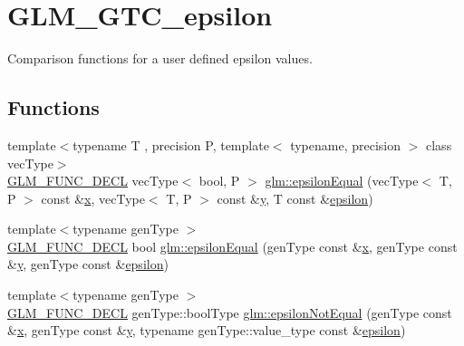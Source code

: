 \hypertarget{group__gtc__epsilon}{}\section{G\+L\+M\+\_\+\+G\+T\+C\+\_\+epsilon}
\label{group__gtc__epsilon}


Comparison functions for a user defined epsilon values.  


\subsection*{Functions}
\begin{DoxyCompactItemize}
\item 
{\footnotesize template$<$typename T , precision P, template$<$ typename, precision $>$ class vec\+Type$>$ }\\\mbox{\hyperlink{setup_8hpp_ab2d052de21a70539923e9bcbf6e83a51}{G\+L\+M\+\_\+\+F\+U\+N\+C\+\_\+\+D\+E\+CL}} vec\+Type$<$ bool, P $>$ \mbox{\hyperlink{group__gtc__epsilon_gaca9443f217dc36587624247245522331}{glm\+::epsilon\+Equal}} (vec\+Type$<$ T, P $>$ const \&\mbox{\hyperlink{glad_8h_a92d0386e5c19fb81ea88c9f99644ab1d}{x}}, vec\+Type$<$ T, P $>$ const \&\mbox{\hyperlink{glad_8h_a66ddd433d2cacfe27f5906b7e86faeed}{y}}, T const \&\mbox{\hyperlink{group__gtc__constants_ga2a1e57fc5592b69cfae84174cbfc9429}{epsilon}})
\item 
{\footnotesize template$<$typename gen\+Type $>$ }\\\mbox{\hyperlink{setup_8hpp_ab2d052de21a70539923e9bcbf6e83a51}{G\+L\+M\+\_\+\+F\+U\+N\+C\+\_\+\+D\+E\+CL}} bool \mbox{\hyperlink{group__gtc__epsilon_gaa7f227999ca09e7ca994e8b35aba47bb}{glm\+::epsilon\+Equal}} (gen\+Type const \&\mbox{\hyperlink{glad_8h_a92d0386e5c19fb81ea88c9f99644ab1d}{x}}, gen\+Type const \&\mbox{\hyperlink{glad_8h_a66ddd433d2cacfe27f5906b7e86faeed}{y}}, gen\+Type const \&\mbox{\hyperlink{group__gtc__constants_ga2a1e57fc5592b69cfae84174cbfc9429}{epsilon}})
\item 
{\footnotesize template$<$typename gen\+Type $>$ }\\\mbox{\hyperlink{setup_8hpp_ab2d052de21a70539923e9bcbf6e83a51}{G\+L\+M\+\_\+\+F\+U\+N\+C\+\_\+\+D\+E\+CL}} gen\+Type\+::bool\+Type \mbox{\hyperlink{group__gtc__epsilon_ga14e2888a304654ade8a3996024e2739c}{glm\+::epsilon\+Not\+Equal}} (gen\+Type const \&\mbox{\hyperlink{glad_8h_a92d0386e5c19fb81ea88c9f99644ab1d}{x}}, gen\+Type const \&\mbox{\hyperlink{glad_8h_a66ddd433d2cacfe27f5906b7e86faeed}{y}}, typename gen\+Type\+::value\+\_\+type const \&\mbox{\hyperlink{group__gtc__constants_ga2a1e57fc5592b69cfae84174cbfc9429}{epsilon}})

\end{DoxyCompactItemize}
